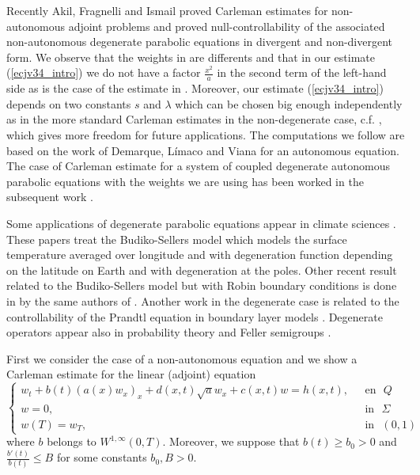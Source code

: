 \documentclass[11pt,oneside,a4papper]{osajnl}
\begin{document}
Recently Akil, Fragnelli and Ismail \cite{fragnelli_no_autonomo} proved Carleman estimates for non-autonomous adjoint problems and proved null-controllability of the associated non-autonomous degenerate parabolic equations in divergent and non-divergent form. We observe that the weights in \cite{fragnelli_no_autonomo} are differents and that in our estimate (\ref{ecjv34_intro}) we do not have a factor $\frac{x^2}{a}$ in the second term of the left-hand side as is the case of the estimate in \cite{fragnelli_no_autonomo}. Moreover, our estimate (\ref{ecjv34_intro}) depends on two constants $s$ and $\lambda$ which can be chosen big enough independently as in the more standard Carleman estimates in the non-degenerate case, c.f. \cite{Fur_Ima-96, GlobalCarleman-06}, which gives more freedom for future applications.
The computations we follow are based on the work of Demarque, Límaco and Viana \cite{DemarqueLimacoViana_deg_eq2018} for an autonomous equation.
The case of Carleman estimate for a system of coupled degenerate autonomous parabolic equations with the weights we are using has been worked in the subsequent work  \cite{DemarqueLimacoViana_deg_sys2020}.

Some applications of degenerate parabolic equations appear in climate sciences \cite{FLORIDIA-2014, fragnelli_no_autonomo}. These papers treat the Budiko-Sellers model which models the surface temperature averaged over longitude and with degeneration function depending on the latitude on Earth and with degeneration at the poles. Other recent result related to the Budiko-Sellers model but with Robin boundary conditions is done in \cite{fragnelli_robin_BC-25} by the same authors of \cite{fragnelli_no_autonomo}. Another work in the degenerate case is related to the controllability of the Prandtl equation in boundary layer models \cite{Martinez_Raymond_Vancostenoble-2003}. Degenerate operators appear also in probability theory and Feller semigroups \cite{Feller-1952,Feller-1954}.

First we consider the case of a non-autonomous equation and we show a Carleman estimate for the linear (adjoint) equation
   \begin{equation}\label{eq:adjunto2_intro}
	\begin{cases}
		w_t+b(t)\left(a(x)w_x\right)_x+d(x,t)\sqrt{a}w_x + c(x,t)w  = h(x,t), & \ \ \ \text{en} \ \ \ {Q}\\
		w=0, & \ \ \ \text{in} \ \ \ {\Sigma}\\
        w(T) = w_T,& \ \ \ \text{in} \ \ \ (0,1)
	\end{cases}
\end{equation}
where $b$ belongs to $W^{1,\infty}(0,T)$. Moreover, we suppose that $b(t) \geq b_0 >0$ and $\frac{b'(t)}{b(t)} \leq B$ for some constants $b_0, B>0$. 
\end{document}
